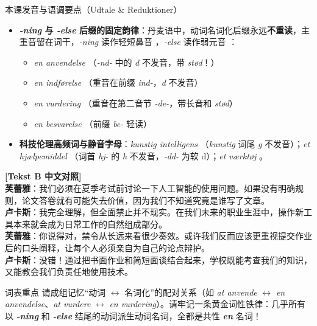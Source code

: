 \begin{tipbox}{本课发音与语调要点（Udtale \& Reduktioner）}
\begin{itemize}
  \item \textbf{\textit{-ning} 与 \textit{-else} 后缀的固定韵律}：丹麦语中，动词名词化后缀永远\textbf{不重读}，主重音留在词干，\textit{-ning} 读作轻短鼻音 ，\textit{-else} 读作弱元音 ：
    \begin{itemize}
      \item \textit{en anvendelse} （\textit{-nd-} 中的 \textit{d} 不发音，带 \textit{stød}！）
      \item \textit{en indførelse} （重音在前缀 \textit{ind-}，\textit{d} 不发音）
      \item \textit{en vurdering} （重音在第二音节 \textit{-de-}，带长音和 \textit{stød}）
      \item \textit{en besvarelse} （前缀 \textit{be-} 轻读）
    \end{itemize}
  \item \textbf{科技伦理高频词与静音字母}：\textit{kunstig intelligens} （\textit{kunstig} 词尾 \textit{g} 不发音）；\textit{et hjælpemiddel} （词首 \textit{hj-} 的 \textit{h} 不发音，\textit{-dd-} 为软 d）；\textit{et værktøj} 。
\end{itemize}
\end{tipbox}

\begin{transbox}
\small
\textbf{\color{NCDTeal}[Tekst B 中文对照]}\\
\textbf{芙蕾雅}：我们必须在夏季考试前讨论一下人工智能的使用问题。如果没有明确规则，论文答卷就有可能失去价值，因为我们不知道究竟是谁写了文章。\\
\textbf{卢卡斯}：我完全理解，但全面禁止并不现实。在我们未来的职业生涯中，操作新工具本来就会成为日常工作的自然组成部分。\\
\textbf{芙蕾雅}：你说得对，禁令从长远来看很少奏效。或许我们反而应该更重视提交作业后的口头阐释，让每个人必须亲自为自己的论点辩护。\\
\textbf{卢卡斯}：没错！通过把书面作业和简短面谈结合起来，学校既能考查我们的知识，又能教会我们负责任地使用技术。
\end{transbox}


\begin{tipbox}{词表重点}
请成组记忆“动词 $\leftrightarrow$ 名词化”的配对关系（如 \textit{at anvende} $\leftrightarrow$ \textit{en anvendelse}、\textit{at vurdere} $\leftrightarrow$ \textit{en vurdering}）。请牢记一条黄金词性铁律：几乎所有以 \textbf{\textit{-ning}} 和 \textbf{\textit{-else}} 结尾的动词派生动词名词，全都是共性 \textbf{\textit{en}} 名词！
\end{tipbox}

